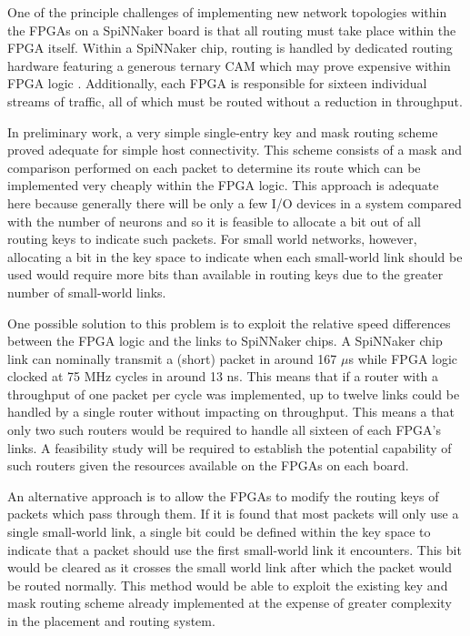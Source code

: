 			One of the principle challenges of implementing new network topologies
			within the FPGAs on a SpiNNaker board is that all routing must take place
			within the FPGA itself. Within a SpiNNaker chip, routing is handled by
			dedicated routing hardware featuring a generous ternary CAM which may
			prove expensive within FPGA logic \cite{locke11}. Additionally, each FPGA is
			responsible for sixteen individual streams of traffic, all of which must
			be routed without a reduction in throughput.
			
			In preliminary work, a very simple single-entry key and mask routing
			scheme proved adequate for simple host connectivity.  This scheme consists
			of a mask and comparison performed on each packet to determine its route
			which can be implemented very cheaply within the FPGA logic.  This
			approach is adequate here because generally there will be only a few I/O
			devices in a system compared with the number of neurons and so it is
			feasible to allocate a bit out of all routing keys to indicate such
			packets.  For small world networks, however, allocating a bit in the key
			space to indicate when each small-world link should be used would require
			more bits than available in routing keys due to the greater number of
			small-world links.
			
			One possible solution to this problem is to exploit the relative speed
			differences between the FPGA logic and the links to SpiNNaker chips. A
			SpiNNaker chip link can nominally transmit a (short) packet in around 167
			$\mu$s while FPGA logic clocked at 75 MHz cycles in around 13 ns. This
			means that if a router with a throughput of one packet per cycle was
			implemented, up to twelve links could be handled by a single router
			without impacting on throughput. This means a that only two such routers
			would be required to handle all sixteen of each FPGA's links. A
			feasibility study will be required to establish the potential capability
			of such routers given the resources available on the FPGAs on each board.
			
			An alternative approach is to allow the FPGAs to modify the routing keys
			of packets which pass through them. If it is found that most packets will
			only use a single small-world link, a single bit could be defined within
			the key space to indicate that a packet should use the first small-world
			link it encounters. This bit would be cleared as it crosses the small
			world link after which the packet would be routed normally. This method
			would be able to exploit the existing key and mask routing scheme already
			implemented at the expense of greater complexity in the placement and
			routing system.
			
